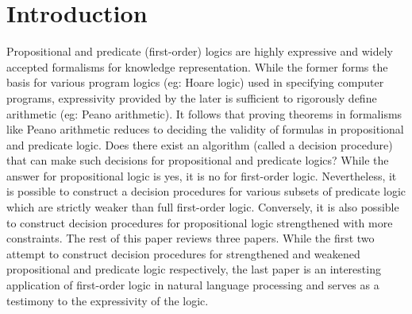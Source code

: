 \section{Introduction}
\label{sec:introduction}

Propositional and predicate (first-order) logics are highly expressive and
widely accepted formalisms for knowledge representation. While the former forms
the basis for various program logics (eg: Hoare logic) used in specifying
computer programs, expressivity provided by the later is sufficient to
rigorously define arithmetic (eg: Peano arithmetic). It follows that proving
theorems in formalisms like Peano arithmetic reduces to deciding the validity of
formulas in propositional and predicate logic. Does there exist an algorithm
(called a decision procedure) that can make such decisions for propositional and
predicate logics? While the answer for propositional logic is yes, it is no for
first-order logic. Nevertheless, it is possible to construct a decision
procedures for various subsets of predicate logic which are strictly weaker than
full first-order logic. Conversely, it is also possible to construct decision
procedures for propositional logic strengthened with more constraints. The rest
of this paper reviews three papers. While the first two attempt to construct
decision procedures for strengthened and weakened propositional and predicate
logic respectively, the last paper is an interesting application of first-order
logic in natural language processing and serves as a testimony to the
expressivity of the logic. 

